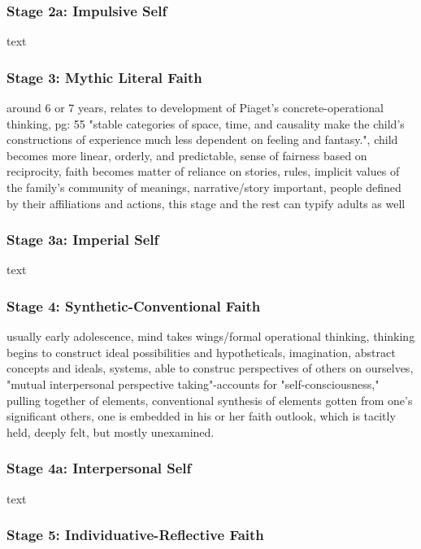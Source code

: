 \subsubsection{Stage 2a: Impulsive Self}

text

\subsubsection{Stage 3: Mythic Literal Faith}

around 6 or 7 years, relates to development of Piaget's concrete-operational thinking, pg: 55 "stable categories of space, time, and causality make the child's constructions of experience much less dependent on feeling and fantasy.", child becomes more linear, orderly, and predictable, sense of fairness based on reciprocity, faith becomes matter of reliance on stories, rules, implicit values of the family's community of meanings, narrative/story important, people defined by their affiliations and actions, this stage and the rest can typify adults as well

\subsubsection{Stage 3a: Imperial Self}

text

\subsubsection{Stage 4: Synthetic-Conventional Faith}

usually early adolescence, mind takes wings/formal operational thinking, thinking begins to construct ideal possibilities and hypotheticals, imagination, abstract concepts and ideals, systems, able to construc perspectives of others on ourselves, "mutual interpersonal perspective taking"-accounts for "self-consciousness," pulling together of elements, conventional synthesis of elements gotten from one's significant others, one is embedded in his or her faith outlook, which is tacitly held, deeply felt, but mostly unexamined.

\subsubsection{Stage 4a: Interpersonal Self}

text

\subsubsection{Stage 5: Individuative-Reflective Faith}

